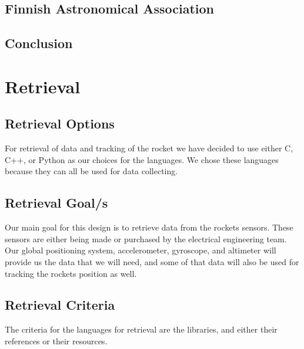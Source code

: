 \documentclass[10pt,draftclsnofoot,onecolumn]{IEEEtran}
\begin{document}
	\subsection{Finnish Astronomical Association}
	
	\subsection{Conclusion}
	
	\section{Retrieval}
\subsection{Retrieval Options}
 For retrieval of data and tracking of the rocket we have decided to use either C, C++, or Python as our choices for the languages.  We chose these languages because they can all be used for data collecting.
 \subsection{Retrieval Goal/s}
 Our main goal for this design is to retrieve data from the rockets sensors.  These sensors are either being made or purchased by the electrical engineering team.  Our global positioning system, accelerometer, gyroscope, and altimeter will provide us the data that we will need, and some of that data will also be used for tracking the rockets position as well.
  \subsection{Retrieval Criteria}
   The criteria for the languages for retrieval are the libraries, and either their references or their resources.
\end{document}
